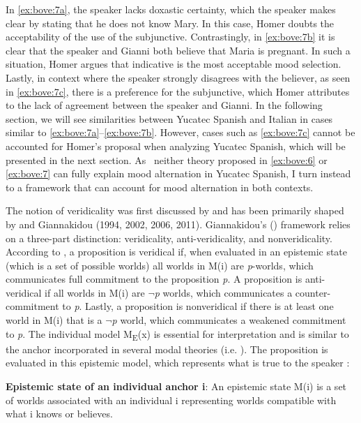 \documentclass[output=paper,colorlinks,citecolor=brown,
]{langscibook}
\begin{document}
In \ref{ex:bove:7a}, the speaker lacks doxastic certainty, which the speaker makes clear by stating that he does not know Mary. In this case, Homer doubts the acceptability of the use of the subjunctive. Contrastingly, in \ref{ex:bove:7b} it is clear that the speaker and Gianni both believe that Maria is pregnant. In such a situation, Homer argues that indicative is the most acceptable mood selection. Lastly, in context where the speaker strongly disagrees with the believer, as seen in \ref{ex:bove:7c}, there is a preference for the subjunctive, which Homer attributes to the lack of agreement between the speaker and Gianni. In the following section, we will see similarities between Yucatec Spanish and Italian in cases similar to \ref{ex:bove:7a}--\ref{ex:bove:7b}. However, cases such as \ref{ex:bove:7c} cannot be accounted for Homer's proposal when analyzing Yucatec Spanish, which will be presented in the next section. As \ neither theory proposed in \ref{ex:bove:6} or \ref{ex:bove:7} can fully explain mood alternation in Yucatec Spanish, I turn instead to a framework that can account for mood alternation in both contexts. 



The notion of veridicality was first discussed by \citet{Montague1969} and has been primarily shaped by \citet{Zwarts1995} and Giannakidou (1994, 2002, 2006, 2011). Giannakidou's (\citeyear{Giannakidou1998,Giannakidou2002,Giannakidou2009,Giannakidou2015}) framework relies on a three-part distinction: veridicality, anti-veridicality, and nonveridicality. According to \citet[17]{Giannakidou2015}, a proposition is veridical if, when evaluated in an epistemic state (which is a set of possible worlds) all worlds in M(i) are \textit{p}{}-worlds, which communicates full commitment to the proposition \textit{p}. A proposition is anti-veridical if all worlds in M(i) are $\neg$\textit{p} worlds, which communicates a counter-commitment to \textit{p}. Lastly, a proposition is nonveridical if there is at least one world in M(i) that is a $\neg$\textit{p} world, which communicates a weakened commitment to \textit{p}. The individual model M\textsubscript{E}(x) is essential for interpretation and is similar to the anchor incorporated in several modal theories (i.e. \citealt{Farkas1992,quer1998}). The proposition is evaluated in this epistemic model, which represents what is true to the speaker \citep{Giannakidou2015}:

\begin{exe}
    \ex\label{ex:bove:8}
   \textbf{ Epistemic state of an individual anchor i}: An epistemic state M(i) is a set of worlds associated with an individual i representing worlds compatible with what i knows or believes.
\end{exe}
\end{document}
